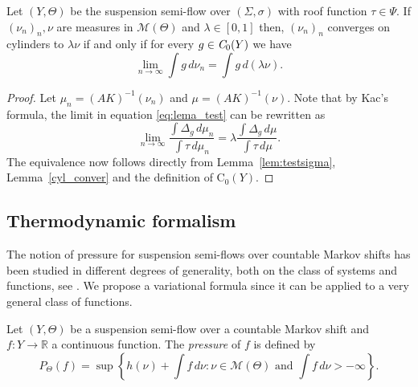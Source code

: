 \documentclass[letterpaper,11pt]{amsart}
\numberwithin{equation}{section}     %
\newcommand{\M}{\mathcal{M}}
\newcommand{\R}{\mathbb{R}}
\def\R{{\mathbb R}}
\def\M{{\mathcal M}}
\def\M{\mathcal{M}}
\begin{document}
\begin{lemma}\label{prop:test}
Let $(Y,\Theta)$ be the suspension semi-flow over $(\Sigma, \sigma)$ with roof function $\tau\in \Psi$. If $(\nu_n)_n, \nu$  are measures in $\M(\Theta)$ and $\lambda \in [0,1]$ then, $(\nu_n)_n$ converges on cylinders to $\lambda \nu$ if and only if for every $g\in \emph{C}_0(Y)$ we have
\begin{equation}  \label{eq:lema_test} 
\lim_{n \to \infty} \int g\, d \nu_n= \int g \, d (\lambda\nu).
\end{equation} 
 \end{lemma}

\begin{proof}
Let $\mu_n= (AK)^{-1}(\nu_n)$ and $\mu= (AK)^{-1}(\nu)$. Note that by Kac's formula, the limit in equation \eqref{eq:lema_test} can be rewritten as 
\begin{equation}\label{eq:test}
\lim_{n \to \infty}  \frac{\int \Delta_g \, d \mu_n }{\int \tau\, d \mu_n}= \lambda  \frac{\int \Delta_g \, d \mu}{\int \tau\, d \mu}.
 \end{equation}
The equivalence now follows directly from Lemma~\ref{lem:testsigma}, Lemma~\ref{cyl_conver} and the definition of $\text{C}_0(Y)$.
\end{proof}













\subsection{Thermodynamic formalism} \label{sec:thm_susp}



The notion of pressure for suspension semi-flows over countable Markov shifts has been studied in different degrees of generality, both on the class of systems and functions, see  \cite{bi,jkl, ke,sav}. We propose a variational formula since it can be applied to a very general class of functions. 

Let $(Y, \Theta)$ be a suspension semi-flow over a countable Markov shift and $f:Y \to \R$ a continuous function. The \emph{pressure} of $f$ is defined by
\begin{equation*}
P_{\Theta}(f)= \sup \left\{h(\nu) +  \int f \, d \nu: \nu \in \M(\Theta)  \text{ and }	   \int f \, d \nu >  -\infty		\right\}.
\end{equation*}
\end{document}
